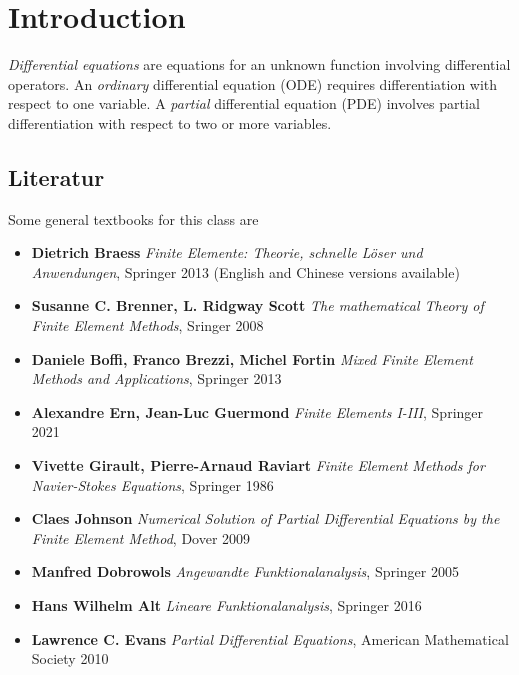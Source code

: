 \chapter{Introduction}
%
{\em Differential equations} are equations for an unknown function
involving differential operators. An {\em ordinary} differential
equation (ODE) requires differentiation with respect to one variable. A {\em
partial} differential equation (PDE) involves partial differentiation with
respect to two or more variables.

\section{Literatur}

Some general textbooks for this class are

\begin{itemize}
\item {\bf Dietrich Braess} {\it Finite Elemente: Theorie, schnelle L\"oser und Anwendungen}, Springer 2013 (English and Chinese versions available)
\item {\bf Susanne C. Brenner, L. Ridgway Scott} {\it The mathematical Theory of Finite Element Methods}, Sringer 2008
\item {\bf Daniele Boffi, Franco Brezzi, Michel Fortin} {\it Mixed Finite Element Methods and Applications}, Springer 2013
\item {\bf Alexandre Ern, Jean-Luc Guermond} {\it Finite Elements I-III}, Springer 2021
\item {\bf Vivette Girault, Pierre-Arnaud Raviart} {\it Finite Element Methods for Navier-Stokes Equations}, Springer 1986
\item {\bf Claes Johnson} {\it Numerical Solution of Partial Differential Equations by the Finite Element Method}, Dover 2009
\item {\bf Manfred Dobrowols} {\it Angewandte Funktionalanalysis}, Springer 2005
\item {\bf Hans Wilhelm Alt} {\it Lineare Funktionalanalysis}, Springer 2016
\item {\bf Lawrence C. Evans} {\it Partial Differential Equations}, American Mathematical Society 2010
\end{itemize}



